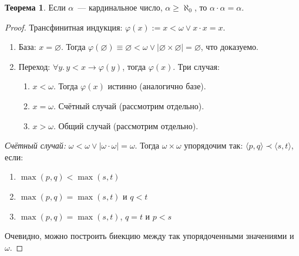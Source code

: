 \documentclass[a4paper,11pt]{article}
\theoremstyle{definition}
\newtheorem*{thm}{Теорема}
\begin{document}
\begin{thm}
Если $\alpha$~--- кардинальное число, $\alpha \ge \aleph_0$, то $\alpha \cdot
\alpha = \alpha$.
\end{thm}
\begin{proof}
Трансфинитная индукция: $\varphi(x) := x < \omega \vee x \cdot x = x$.
\begin{enumerate}
\item База: $x = \varnothing$. Тогда $\varphi(\varnothing) \equiv \varnothing <
  \omega \vee |\varnothing \times \varnothing| = \varnothing$, что доказуемо.
\item Переход: $\forall y.\,y < x \to \varphi(y)$, тогда $\varphi(x)$. Три
  случая:
  \begin{enumerate}
  \item $x < \omega$. Тогда $\varphi(x)$ истинно (аналогично базе).
  \item $x = \omega$. Счётный случай (рассмотрим отдельно).
  \item $x > \omega$. Общий случай (рассмотрим отдельно).
  \end{enumerate}
\end{enumerate}

\emph{Счётный случай:} $\omega < \omega \vee |\omega \cdot \omega| = \omega$.
Тогда $\omega \times \omega$ упорядочим так: $\langle p, q\rangle \prec \langle
s, t\rangle$, если:
\begin{enumerate}
\item $\max(p, q) < \max(s, t)$
\item $\max(p, q) = \max(s, t)$ и $q < t$
\item $\max(p, q) = \max(s, t)$, $q = t$ и $p < s$
\end{enumerate}
Очевидно, можно построить биекцию между так упорядоченными значениями и
$\omega$.


\end{proof}
\end{document}
